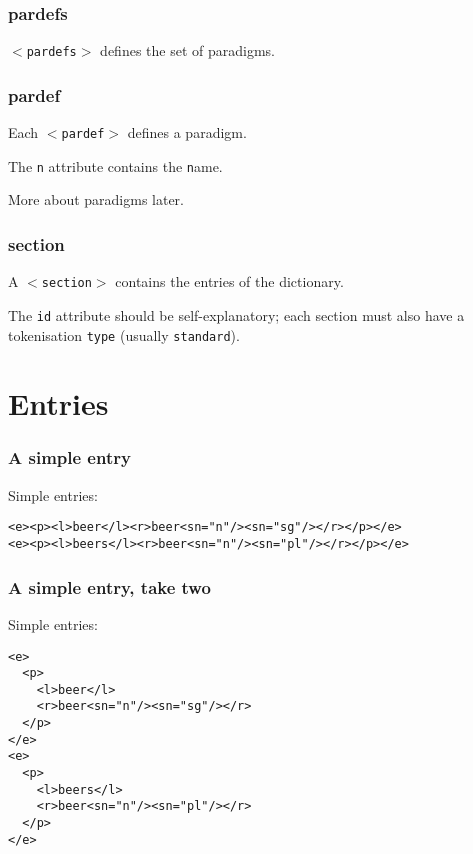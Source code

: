 \documentclass{beamer} %
\begin{document}
\begin{frame}
  \frametitle{pardefs}

  {\tt $<$pardefs$>$} defines the set of paradigms.

\end{frame}

\begin{frame}
  \frametitle{pardef}

  Each {\tt $<$pardef$>$} defines a paradigm.

  The {\tt n} attribute contains the {\tt n}ame.

  \pause

  More about paradigms later.

\end{frame}

\begin{frame}
  \frametitle{section}

  A {\tt $<$section$>$} contains the entries of the dictionary.

  The {\tt id} attribute should be self-explanatory; each section must 
  also have a tokenisation {\tt type} (usually {\tt standard}). 

\end{frame}

\section{Entries}

\begin{frame}
  \frametitle{A simple entry}

  \begin{exampleblock}{Simple entries:}
    \begin{footnotesize}
    \begin{alltt}
      <e><p><l>beer</l><r>beer<s n="n"/><s n="sg"/></r></p></e>
      <e><p><l>beers</l><r>beer<s n="n"/><s n="pl"/></r></p></e>
    \end{alltt}
    \end{footnotesize}
\end{exampleblock}


\end{frame}

\begin{frame}
  \frametitle{A simple entry, take two}

  \begin{exampleblock}{Simple entries:}
    \begin{footnotesize}
    \begin{alltt}
      <e>
      ~~<p>
      ~~~~<l>beer</l>
      ~~~~<r>beer<s n="n"/><s n="sg"/></r>
      ~~</p>
      </e>
      <e>
      ~~<p>
      ~~~~<l>beers</l>
      ~~~~<r>beer<s n="n"/><s n="pl"/></r>
      ~~</p>
      </e>
    \end{alltt}
    \end{footnotesize}
\end{exampleblock}


\end{frame}
\end{document}
